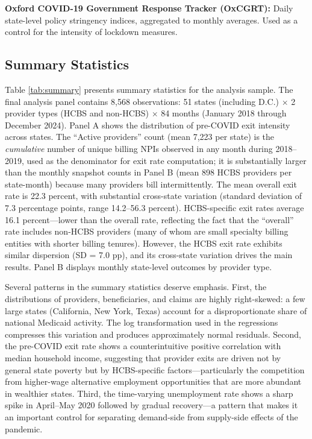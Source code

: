 \documentclass[12pt]{article}
\begin{document}
\textbf{Oxford COVID-19 Government Response Tracker (OxCGRT):} Daily state-level policy stringency indices, aggregated to monthly averages. Used as a control for the intensity of lockdown measures.

\subsection{Summary Statistics}



Table \ref{tab:summary} presents summary statistics for the analysis sample. The final analysis panel contains 8,568 observations: 51 states (including D.C.) $\times$ 2 provider types (HCBS and non-HCBS) $\times$ 84 months (January 2018 through December 2024). Panel A shows the distribution of pre-COVID exit intensity across states. The ``Active providers'' count (mean 7,223 per state) is the \emph{cumulative} number of unique billing NPIs observed in any month during 2018--2019, used as the denominator for exit rate computation; it is substantially larger than the monthly snapshot counts in Panel B (mean 898 HCBS providers per state-month) because many providers bill intermittently. The mean overall exit rate is 22.3 percent, with substantial cross-state variation (standard deviation of 7.3 percentage points, range 14.2--56.3 percent). HCBS-specific exit rates average 16.1 percent---lower than the overall rate, reflecting the fact that the ``overall'' rate includes non-HCBS providers (many of whom are small specialty billing entities with shorter billing tenures). However, the HCBS exit rate exhibits similar dispersion (SD = 7.0 pp), and its cross-state variation drives the main results. Panel B displays monthly state-level outcomes by provider type.

Several patterns in the summary statistics deserve emphasis. First, the distributions of providers, beneficiaries, and claims are highly right-skewed: a few large states (California, New York, Texas) account for a disproportionate share of national Medicaid activity. The log transformation used in the regressions compresses this variation and produces approximately normal residuals. Second, the pre-COVID exit rate shows a counterintuitive positive correlation with median household income, suggesting that provider exits are driven not by general state poverty but by HCBS-specific factors---particularly the competition from higher-wage alternative employment opportunities that are more abundant in wealthier states. Third, the time-varying unemployment rate shows a sharp spike in April--May 2020 followed by gradual recovery---a pattern that makes it an important control for separating demand-side from supply-side effects of the pandemic.
\end{document}
